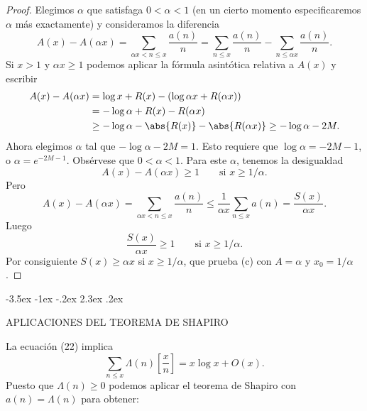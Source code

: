 \documentclass[12pt,a4paper]{book}
\makeatletter
\renewcommand\section{\@startsection{section}{1}{\z@}%
  {-3.5ex \@plus -1ex \@minus -.2ex}%
  {2.3ex \@plus .2ex}%
  {\normalfont\Large\bfseries\raggedright}}
\makeatother
\begin{document}
\begin{proof}
        Elegimos $\alpha$ que satisfaga $0<\alpha<1$ (en un cierto momento
        especificaremos $\alpha$ más exactamente) y consideramos la diferencia
        \begin{equation*}
            A(x)-A(\alpha x)=\sum_{\alpha x<n\leq x}\frac{a(n)}{n}=\sum_{n\leq x}\frac{a(n)}{n}
            -\sum_{n\leq\alpha x}\frac{a(n)}{n}.
        \end{equation*}
        Si $x>1$ y $\alpha x\geq1$ podemos aplicar la fórmula asintótica relativa a
        $A(x)$ y escribir
        \begin{align*}
            A(x)-A(\alpha x)&=\log x+R(x)-(\log\alpha x+R(\alpha x))\\
            &=-\log\alpha+R(x)-R(\alpha x)\\
            &\geq-\log\alpha-\abs{R(x)}-\abs{R(\alpha x)}\geq-\log\alpha-2M.
        \end{align*}
        Ahora elegimos $\alpha$ tal que $-\log\alpha-2M=1$. Esto requiere que
        $\log\alpha=-2M-1$, o $\alpha=e^{-2M-1}$. Obsérvese que $0<\alpha<1$. Para
        este $\alpha$, tenemos la desigualdad
        \begin{equation*}
            A(x)-A(\alpha x)\geq1\qquad\text{si } x\geq1/\alpha.
        \end{equation*}
        Pero
        \begin{equation*}
            A(x)-A(\alpha x)=\sum_{\alpha x<n\leq x}\frac{a(n)}{n}\leq\frac{1}{\alpha x}\sum_{n\leq x}a(n)
            =\frac{S(x)}{\alpha x}.
        \end{equation*}
        Luego
        \begin{equation*}
            \frac{S(x)}{\alpha x}\geq1\qquad\text{si } x\geq1/\alpha.
        \end{equation*}
        Por consiguiente $S(x)\geq\alpha x$ si $x\geq1/\alpha$, que prueba (c) con
        $A=\alpha$ y $x_{0}=1/\alpha$.
    \end{proof}

    \section{APLICACIONES DEL TEOREMA DE SHAPIRO}

    La ecuación (22) implica
    \begin{equation*}
        \sum_{n\leq x}\Lambda(n)\left[\frac{x}{n}\right]=x\log x+O(x).
    \end{equation*}
    Puesto que $\Lambda(n)\geq0$ podemos aplicar el teorema de Shapiro con
    $a(n)=\Lambda(n)$ para obtener:
\end{document}
